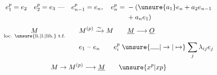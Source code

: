 \[
 \begin{aligned}
 e_1^p=e_2\quad e_2^p=e_3\ \text{---}\quad e_{n-1}^{p}=e_n,\quad
 e_n^p={}&-(\unsure{a_1}e_n+a_2e_{n-1}\\
 &{}+a_ne_1)
 \end{aligned}
\]
\[
 \begin{aligned}
 \underset{\text{loc. \unsure{li.|l.|lib.} t.f.}}M\qquad&M^{(p)}\xrightarrow{\sim}M
   \qquad\underline M\longrightarrow\underline O\\
 &e_1\ \text{--}\ e_n\qquad e_i^p\mathrel{\unsure{\rule{1.3em}{.4pt}|\to|\mapsto}}\sum_j\lambda_{ij}e_j
 \end{aligned}
\]
\[
 M\to M^{(p)}\longrightarrow\underline M\qquad \unsure{x^p|xp}
\]
